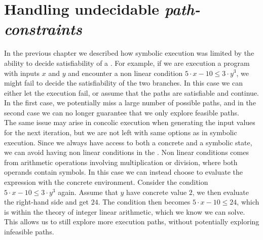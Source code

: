 \section{Handling undecidable \emph{path-constraints}} 
In the previous chapter we described how symbolic execution was limited by the ability to decide satisfiability of a \pc. For example, if we are execution a program with inputs $x$ and $y$ and encounter a non linear condition $ 5\cdot x - 10 \leq 3 \cdot y^3$, we might fail to decide the satisfiability of the two branches. In this case we can either let the execution fail, or assume that the paths are satisfiable and continue. In the first case, we potentially miss a large number of possible paths, and in the second case we can no longer guarantee that we only explore feasible paths.\\
The same issue may arise in concolic execution when generating the input values for the next iteration, but we are not left with same options as in symbolic execution. Since we always have access to both a concrete and a symbolic state, we can avoid having non linear conditions in the \pc. Non linear conditions comes from arithmetic operations involving multiplication or division, where both operands contain symbols. In this case we can instead choose to evaluate the expression with the concrete environment\cite{Godefroid:2005:DDA:1064978.1065036}. Consider the condition $ 5\cdot x - 10 \leq 3 \cdot y^3$ again. Assume that $y$ have concrete value $2$, we then evaluate the right-hand side and get $24$. The condition then becomes $ 5\cdot x - 10 \leq 24$, which is within the theory of integer linear arithmetic, which we know we can solve. This allows us to still explore more execution paths, without potentially exploring infeasible paths. 